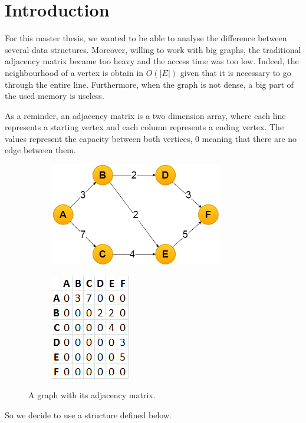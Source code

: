 \section{Introduction}
For this master thesis, we wanted to be able to analyse the difference between several data structures. Moreover, willing to work with big graphs, the traditional adjacency matrix became too heavy and the access time was too low. Indeed, the neighbourhood of a vertex is obtain in $O(|E|)$ given that	it is necessary to go through the entire line. Furthermore, when the graph is not dense, a big part of the used memory is useless.

As a reminder, an adjacency matrix is a two dimension array, where each line represents a starting vertex and each column represents a ending vertex. The values represent the capacity between both vertices, 0 meaning that there are no edge between them. \newline

\begin{figure}[!h]
\begin{subfigure}{.6\textwidth}
\includegraphics[width=7.5cm,height=4.5cm]{images/graph.png}
\end{subfigure}
\begin{subfigure}{.4\textwidth}
\includegraphics[scale=0.7]{images/adjacencyMatrix.png}
\end{subfigure}
\caption{A graph with its adjacency matrix.}
\end{figure}

So we decide to use a structure defined below. \newline

